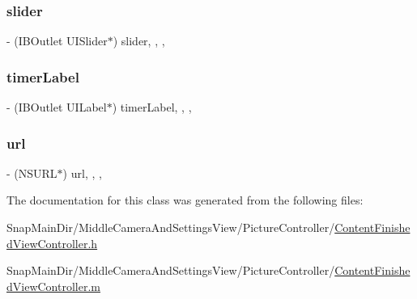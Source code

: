 \hypertarget{interface_content_finished_view_controller_abba582b538b4308dd10ad43a6aa5c81d}{}\label{interface_content_finished_view_controller_abba582b538b4308dd10ad43a6aa5c81d} 
\subsubsection{\texorpdfstring{slider}{slider}}
{\footnotesize\ttfamily -\/ (I\+B\+Outlet U\+I\+Slider$\ast$) slider\hspace{0.3cm}{\ttfamily [read]}, {\ttfamily [write]}, {\ttfamily [nonatomic]}, {\ttfamily [weak]}}

\hypertarget{interface_content_finished_view_controller_a4b560790e244f4aad1b373708b04db1a}{}\label{interface_content_finished_view_controller_a4b560790e244f4aad1b373708b04db1a} 
\subsubsection{\texorpdfstring{timer\+Label}{timerLabel}}
{\footnotesize\ttfamily -\/ (I\+B\+Outlet U\+I\+Label$\ast$) timer\+Label\hspace{0.3cm}{\ttfamily [read]}, {\ttfamily [write]}, {\ttfamily [nonatomic]}, {\ttfamily [weak]}}

\hypertarget{interface_content_finished_view_controller_a2b5223830df719daa6545c19aafc1f8a}{}\label{interface_content_finished_view_controller_a2b5223830df719daa6545c19aafc1f8a} 
\subsubsection{\texorpdfstring{url}{url}}
{\footnotesize\ttfamily -\/ (N\+S\+U\+RL$\ast$) url\hspace{0.3cm}{\ttfamily [read]}, {\ttfamily [write]}, {\ttfamily [nonatomic]}, {\ttfamily [strong]}}



The documentation for this class was generated from the following files\+:\begin{DoxyCompactItemize}
\item 
Snap\+Main\+Dir/\+Middle\+Camera\+And\+Settings\+View/\+Picture\+Controller/\hyperlink{_content_finished_view_controller_8h}{Content\+Finished\+View\+Controller.\+h}\item 
Snap\+Main\+Dir/\+Middle\+Camera\+And\+Settings\+View/\+Picture\+Controller/\hyperlink{_content_finished_view_controller_8m}{Content\+Finished\+View\+Controller.\+m}\end{DoxyCompactItemize}
